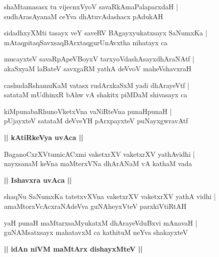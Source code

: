 \documentclass[twoside,12pt,openright]{book}
\newcounter{shloka}[chapter]
\def\uvaca#1{\centerline{{\large\textbf{#1}}}}
\begin{document}
\begin{shloka}%
shaMtamasasx tu vijecnxVyoV savaRkAmaPalaparxdaH |\\
sudhArasAyanaM ceYva dhAtuvAdashacx pAdukAH 
\end{shloka}

\begin{shloka}%
sidadhxyXMti tasayx veY saveRV BAgayxyukatxsayx SaNumxKa |\\
mAtaqpitaqSavxsaqBArxtaqgurUnAvxtha nihatayx ca 
\end{shloka}

\begin{shloka}%
mucayxteV savaRpApeVBoyxV tarxyoVdashAsayxdhAraNAtf |\\
akaSxyaM laBateV savxgaRM yathA deVvoV maheVshavxraH 
\end{shloka}

\begin{shloka}%
cashudaRshamuKaM vatasx rudArxkaSxM yadi dhArayeVtf |\\
satataM mUdhinxR bAhw vA shakitx piMDaM shivasayx ca
\end{shloka}

\begin{shloka}%
kiMpunabaRhunoVketxVna vaNiRteVna punaHpunaH |\\
pUjayxteV satataM deVveYH pArxpayxteV puNayxgwravAtf 
\end{shloka}

\uvaca{|| kAtiRkeVya uvAca ||}

\begin{shloka}%
BaganoCxrXVtumicACxmi vaketxrXV vaketxrXV yathAvidhi |\\
nayxsanaM keVna maMterxVNa dhArANaM vA kathaM vada 
\end{shloka}

\uvaca{|| Ishavxra uvAca ||}

\begin{shloka}%
shaqNu SaNumxKa tatetxvXVna vaketxrXV vaketxrXV yathA vidhi |\\
amaMtorxVcAcxraNAdeVva guNAheyxVteV parxkiVtiRtAH 
\end{shloka}

\begin{shloka}%
yaH punaH maMtarxsaMyukatxM dhArayeVduBxvi mAnavaH |\\
guNAMsatxsayx mahatavxM ca kathituM neYva shakayxteV 
\end{shloka}

\uvaca{|| idAn niVM maMtArx dishayxMteV ||}
\end{document}
